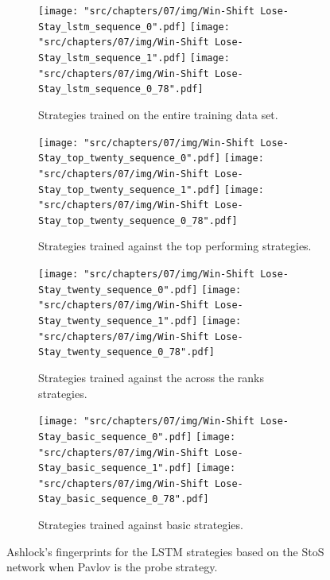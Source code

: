 \begin{figure}[!htbp]
    \begin{subfigure}{\textwidth}
        \texttt{[image: "src/chapters/07/img/Win-Shift Lose-Stay\_lstm\_sequence\_0".pdf]}
        \texttt{[image: "src/chapters/07/img/Win-Shift Lose-Stay\_lstm\_sequence\_1".pdf]}
        \texttt{[image: "src/chapters/07/img/Win-Shift Lose-Stay\_lstm\_sequence\_0\_78".pdf]}
        \caption{Strategies trained on the entire training data set.}
    \end{subfigure}
    \begin{subfigure}{\textwidth}
        \texttt{[image: "src/chapters/07/img/Win-Shift Lose-Stay\_top\_twenty\_sequence\_0".pdf]}
        \texttt{[image: "src/chapters/07/img/Win-Shift Lose-Stay\_top\_twenty\_sequence\_1".pdf]}
        \texttt{[image: "src/chapters/07/img/Win-Shift Lose-Stay\_top\_twenty\_sequence\_0\_78".pdf]}
        \caption{Strategies trained against the top performing strategies.}
    \end{subfigure}
    \begin{subfigure}{\textwidth}
        \texttt{[image: "src/chapters/07/img/Win-Shift Lose-Stay\_twenty\_sequence\_0".pdf]}
        \texttt{[image: "src/chapters/07/img/Win-Shift Lose-Stay\_twenty\_sequence\_1".pdf]}
        \texttt{[image: "src/chapters/07/img/Win-Shift Lose-Stay\_twenty\_sequence\_0\_78".pdf]}
        \caption{Strategies trained against the across the ranks strategies.}
    \end{subfigure}
    \begin{subfigure}{\textwidth}
        \texttt{[image: "src/chapters/07/img/Win-Shift Lose-Stay\_basic\_sequence\_0".pdf]}
        \texttt{[image: "src/chapters/07/img/Win-Shift Lose-Stay\_basic\_sequence\_1".pdf]}
        \texttt{[image: "src/chapters/07/img/Win-Shift Lose-Stay\_basic\_sequence\_0\_78".pdf]}
        \caption{Strategies trained against basic strategies.}
    \end{subfigure}
    \caption{Ashlock's fingerprints for the LSTM strategies based on the StoS
    network when Pavlov is the probe strategy.}\label{fig:ashlock_fingerprints_pavlov_s_to_s}
\end{figure}

